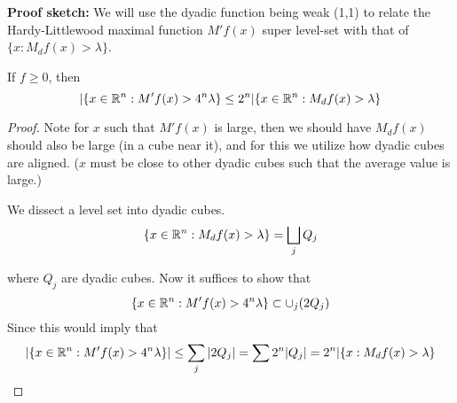 \textbf{Proof sketch:} We will use the dyadic function being weak (1,1) to relate the Hardy-Littlewood maximal function $M'f(x)$ super level-set with that of $\{x: M_df(x)>\lambda\}$.
\begin{lemma}
    If $f\geq 0$, then 
    \begin{equation*}
        |\{x\in\mathbb{R}^n: M'f(x)>4^n\lambda\}\leq 2^n|\{x\in \mathbb{R}^n: M_df(x)>\lambda\}
    \end{equation*}
\end{lemma}
\begin{proof}
    Note for $x$ such that $M'f(x)$ is large, then we should have $M_df(x)$ should also be large (in  a cube near it), and for this we utilize how dyadic cubes are aligned. ($x$ must be close to other dyadic cubes such that the average value is large.)

    We dissect a level set into dyadic cubes. 
    \begin{equation*}
        \{x\in\mathbb{R}^n: M_df(x)>\lambda\}=\bigsqcup_j Q_j
    \end{equation*}
    
    where $Q_j$ are dyadic cubes. Now it suffices to show that 
    \begin{equation*}
        \{x\in\mathbb{R}^n: M'f(x)>4^n\lambda\}\subset \cup_j(2Q_j)
    \end{equation*} 
    Since this would imply that
    \begin{equation*}
        |\{x\in\mathbb{R}^n: M'f(x)>4^n\lambda\}|\leq\sum_j|2Q_j|=\sum 2^n|Q_j|=2^n|\{x: M_df(x)>\lambda\}
    \end{equation*}


\end{proof}
